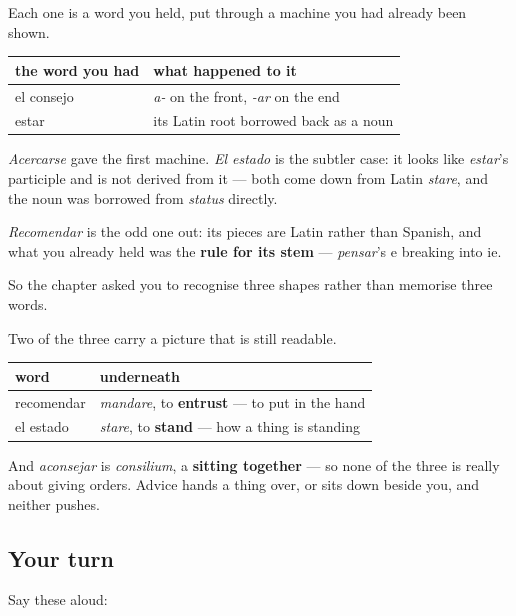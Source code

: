 \begin{grammarlens}[title={Grammar Lens: none of the three was really new}]
Each one is a word you held, put through a machine you had already been shown.

\noindent
\begin{tabularx}{\linewidth}{@{}>{\raggedright\arraybackslash}X>{\raggedright\arraybackslash}X@{}}
\toprule
\textbf{the word you had} & \textbf{what happened to it} \\
\midrule
el consejo & \emph{a-} on the front, \emph{-ar} on the end \\
estar & its Latin root borrowed back as a noun \\
\bottomrule
\end{tabularx}

\emph{Acercarse} gave the first machine. \emph{El estado} is the subtler case: it looks like \emph{estar}'s participle and is not derived from it — both come down from Latin \emph{stare}, and the noun was borrowed from \emph{status} directly.

\emph{Recomendar} is the odd one out: its pieces are Latin rather than Spanish, and what you already held was the \textbf{rule for its stem} — \emph{pensar}'s e breaking into ie.

So the chapter asked you to recognise three shapes rather than memorise three words.
\end{grammarlens}

\begin{cousinweb}
Two of the three carry a picture that is still readable.

\noindent
\begin{tabularx}{\linewidth}{@{}>{\raggedright\arraybackslash}X>{\raggedright\arraybackslash}X@{}}
\toprule
\textbf{word} & \textbf{underneath} \\
\midrule
recomendar & \emph{mandare}, to \textbf{entrust} — to put in the hand \\
el estado & \emph{stare}, to \textbf{stand} — how a thing is standing \\
\bottomrule
\end{tabularx}

And \emph{aconsejar} is \emph{consilium}, a \textbf{sitting together} — so none of the three is really about giving orders. Advice hands a thing over, or sits down beside you, and neither pushes.
\end{cousinweb}

\subsection*{Your turn}
Say these aloud:

